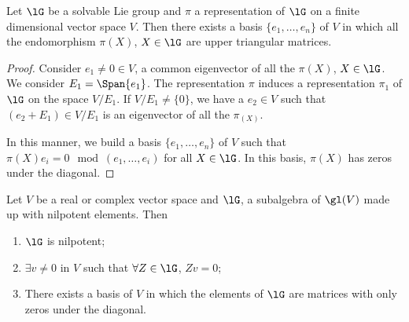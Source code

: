 \begin{corollary}
Let $\lG$ be a solvable Lie group and $\pi$ a representation of $\lG$ on a finite dimensional vector space $V$. Then there exists a basis $\{e_1,\ldots,e_n\}$ of $V$ in which all the endomorphism $\pi(X)$, $X\in\lG$ are upper triangular matrices.
\label{cor:de_Lie_Vu}
\end{corollary}

\begin{proof}
Consider $e_1\neq 0\in V$, a common eigenvector of all the $\pi(X)$, $X\in\lG$. We consider $E_1=\Span\{e_1\}$. The representation $\pi$ induces a representation $\pi_1$ of $\lG$ on the space $V/E_1$. If $V/E_1\neq\{0\}$, we have a $e_2\in V$ such that $(e_2+E_1)\in V/E_1$ is an eigenvector of all the $\pi_(X)$.

In this manner, we build a basis $\{e_1,\ldots,e_n\}$ of $V$ such that $\pi(X)e_i=0\mod(e_1,\ldots,e_i)$ for all $X\in\lG$. In this basis, $\pi(X)$ has zeros under the diagonal.
\end{proof}

\begin{theorem}
Let $V$ be a real or complex vector space and $\lG$, a subalgebra of $\gl(V)$ made up with nilpotent elements. Then

\begin{enumerate}
\item $\lG$ is nilpotent;
\item $\exists v\neq 0$ in $V$ such that $\forall Z\in\lG$, $Zv=0$;
\item There exists a basis of $V$ in which the elements of $\lG$ are matrices with only zeros under the diagonal.
\end{enumerate}
\label{tho:trois_nil}
\end{theorem}

